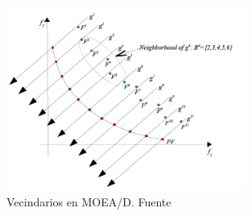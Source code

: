 \begin{figure}[H]
  \centering
  \includegraphics[width=0.7\textwidth]{figures/moead.png}
  \caption{Vecindarios en MOEA/D. Fuente \cite{moead_imagen}}
  \label{fig:moead}
\end{figure}

